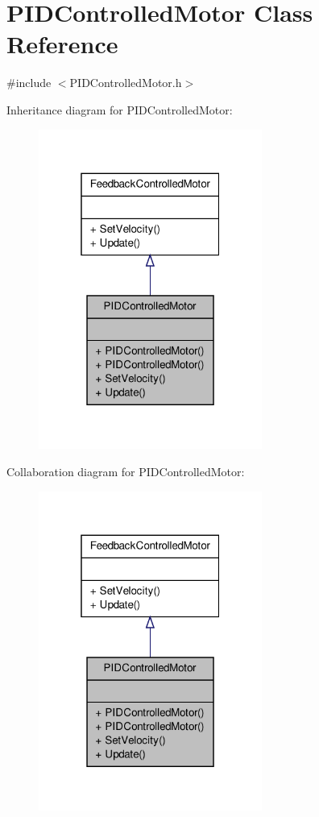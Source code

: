 \hypertarget{class_p_i_d_controlled_motor}{\section{P\-I\-D\-Controlled\-Motor Class Reference}
\label{class_p_i_d_controlled_motor}
}


{\ttfamily \#include $<$P\-I\-D\-Controlled\-Motor.\-h$>$}



Inheritance diagram for P\-I\-D\-Controlled\-Motor\-:
\nopagebreak
\begin{figure}[H]
\begin{center}
\leavevmode
\includegraphics[width=208pt]{class_p_i_d_controlled_motor__inherit__graph}
\end{center}
\end{figure}


Collaboration diagram for P\-I\-D\-Controlled\-Motor\-:
\nopagebreak
\begin{figure}[H]
\begin{center}
\leavevmode
\includegraphics[width=208pt]{class_p_i_d_controlled_motor__coll__graph}
\end{center}
\end{figure}
